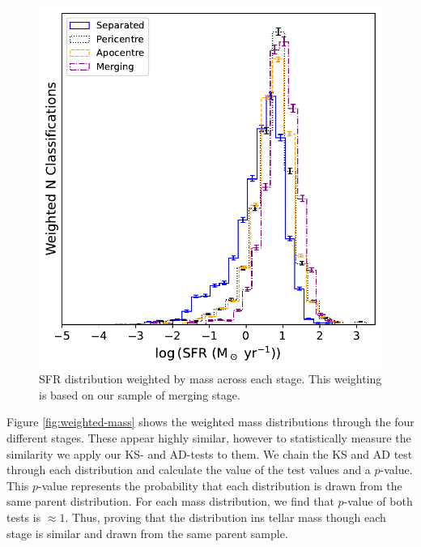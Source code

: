 \begin{figure}
    \centering
    \includegraphics[width=\textwidth]{Chapter3/figures/sfr_dist.pdf}
    \caption[SFR distribution weighted by mass across each stage.]{SFR distribution weighted by mass across each stage. This weighting is based on our sample of merging stage.}
    \label{fig:weighted-sfr}
\end{figure}

Figure \ref{fig:weighted-mass} shows the weighted mass distributions through the four different stages. These appear highly similar, however to statistically measure the similarity we apply our KS- and AD-tests to them. We chain the KS and AD test through each distribution and calculate the value of the test values and a $p$-value. This $p$-value represents the probability that each distribution is drawn from the same parent distribution. For each mass distribution, we find that $p$-value of both tests is $\approx1$. Thus, proving that the distribution ins tellar mass though each stage is similar and drawn from the same parent sample. 

